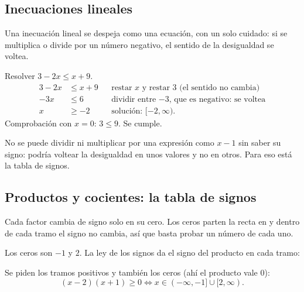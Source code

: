 \documentclass[11pt,a4paper]{article}
\begin{document}
\subsection{Inecuaciones lineales}
Una inecuación lineal se despeja como una ecuación, con un solo cuidado: si se multiplica o divide por un número
negativo, el sentido de la desigualdad se voltea.

\begin{ejemplo}
Resolver $3-2x\le x+9$.
\begin{align*}
3-2x &\le x+9 &&\text{restar $x$ y restar $3$ (el sentido no cambia)}\\
-3x &\le 6 &&\text{dividir entre $-3$, que es negativo: se voltea}\\
x &\ge -2 &&\text{solución: } [-2,\infty).
\end{align*}
Comprobación con $x=0$: $3\le 9$. Se cumple.
\end{ejemplo}

\begin{ojo}
No se puede dividir ni multiplicar por una expresión como $x-1$ sin saber su signo: podría voltear la desigualdad
en unos valores y no en otros. Para eso está la tabla de signos.
\end{ojo}

\subsection{Productos y cocientes: la tabla de signos}
Cada factor cambia de signo solo en su cero. Los ceros parten la recta en  y dentro de cada tramo
el signo no cambia, así que basta probar un número de cada uno.

\begin{ejemplo}
Los ceros son $-1$ y $2$. La ley de los signos da el signo del producto en cada tramo:
\begin{figura}
\end{figura}
Se piden los tramos positivos y también los ceros (ahí el producto vale $0$):
\[ (x-2)(x+1)\ge 0 \iff x\in(-\infty,-1]\cup[2,\infty). \]
\end{ejemplo}
\end{document}
